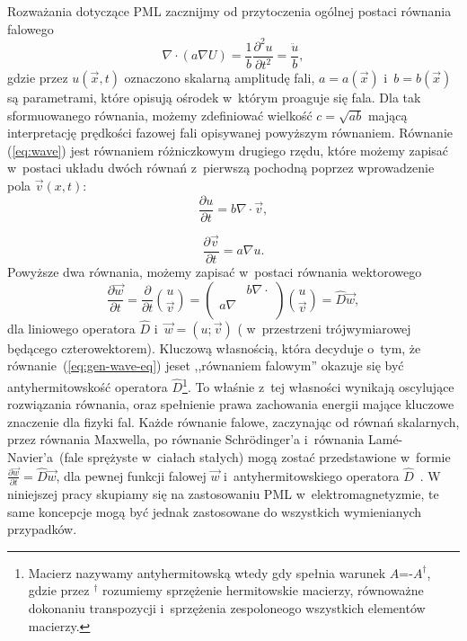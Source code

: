Rozważania dotyczące PML zacznijmy od przytoczenia ogólnej postaci równania falowego~\cite{barton1989elements}
\begin{equation}
\nabla \cdot ( a \nabla U) = \frac{1}{b} \frac{\partial^2 u}{\partial t^2} = \frac{\ddot{u}}{b},
\label{eq:wave}
\end{equation}
gdzie przez $u(\vec{x},t)$ oznaczono skalarną amplitudę fali, $a=a(\vec{x})$ i~$b=b(\vec{x})$ są parametrami, które opisują ośrodek w~którym proaguje się fala. Dla tak sformuowanego równania, możemy zdefiniować wielkość $c=\sqrt{ab}$ mającą interpretację prędkości fazowej fali opisywanej powyższym równaniem. Równanie (\ref{eq:wave}) jest równaniem różniczkowym drugiego rzędu, które możemy zapisać w~postaci układu dwóch równań z~pierwszą pochodną poprzez wprowadzenie pola $\vec{v}(x,t)$:
\begin{equation}
\frac{\partial u}{\partial t} = b \nabla \cdot \vec{v},
\end{equation}

\begin{equation}
\frac{\partial \vec{v}}{\partial t}= a\nabla u.
\end{equation}
Powyższe dwa równania, możemy zapisać  w~postaci równania wektorowego
\begin{equation}
\frac{\partial \vec{w}}{\partial t}=\frac{\partial}{\partial t} {u \choose \vec{v}} = 
	\begin{pmatrix}
		& b\nabla\cdot \\
	a\nabla & \\
	\end{pmatrix}
{u \choose \vec{v}} = \hat{D}\vec{w},
\label{eq:gen-wave-eq}
\end{equation}
dla liniowego operatora $\hat{D}$ i~$\vec{w}=(u;\vec{v})$ ( w~przestrzeni trójwymiarowej będącego czterowektorem). Kluczową własnością, która decyduje o~tym, że równanie~(\ref{eq:gen-wave-eq}) jeset ,,równaniem falowym''  okazuje się być antyhermitowskość operatora $\hat{D}$\footnote{Macierz nazywamy antyhermitowską wtedy gdy spełnia warunek $A$=-$A^\dag$, gdzie przez $^\dag$ rozumiemy sprzężenie hermitowskie macierzy, równoważne dokonaniu transpozycji i~sprzężenia zespoloneogo wszystkich elementów macierzy.}. To właśnie z~tej własności wynikają oscylujące rozwiązania równania, oraz spełnienie prawa zachowania energii mające kluczowe znaczenie dla fizyki fal. Każde równanie falowe, zaczynając od równań skalarnych, przez równania Maxwella,  po równanie Schr\"{o}dinger'a i~równania Lam\'{e}-Navier'a~(fale sprężyste w~ciałach stałych) mogą zostać przedstawione w~formie $ \frac{\partial  \vec{w}}{\partial t}=\hat{D}\vec{w}$, dla pewnej funkcji falowej $\vec{w}$ i~antyhermitowskiego operatora $\hat{D}$~\cite{johnson2007notes}. W niniejszej pracy skupiamy się na zastosowaniu PML w~elektromagnetyzmie, te same koncepcje mogą być jednak zastosowane do wszystkich wymienianych przypadków.

